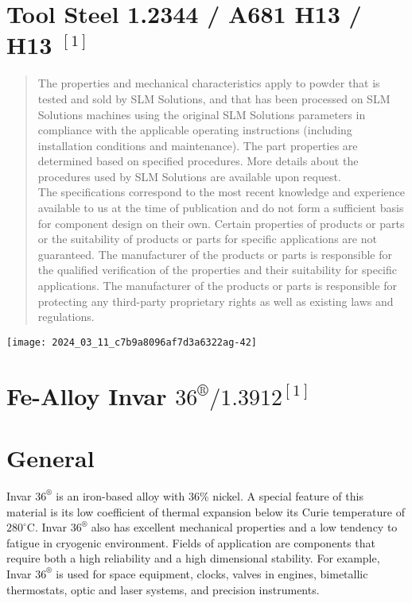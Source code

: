 \documentclass[10pt]{article}
\begin{document}
\section*{Tool Steel 1.2344 / A681 H13 / H13 ${ }^{[1]}$ }
\begin{abstract}
The properties and mechanical characteristics apply to powder that is tested and sold by SLM Solutions, and that has been processed on SLM Solutions machines using the original SLM Solutions parameters in compliance with the applicable operating instructions (including installation conditions and maintenance). The part properties are determined based on specified procedures. More details about the procedures used by SLM Solutions are available upon request.\\
The specifications correspond to the most recent knowledge and experience available to us at the time of publication and do not form a sufficient basis for component design on their own. Certain properties of products or parts or the suitability of products or parts for specific applications are not guaranteed. The manufacturer of the products or parts is responsible for the qualified verification of the properties and their suitability for specific applications. The manufacturer of the products or parts is responsible for protecting any third-party proprietary rights as well as existing laws and regulations.
\end{abstract}

\begin{center}
\texttt{[image: 2024\_03\_11\_c7b9a8096af7d3a6322ag-42]}
\end{center}

\section*{Fe-Alloy Invar $36^{\circledR} / 1.3912^{[1]}$}
\section*{General}
Invar $36^{\circledR}$ is an iron-based alloy with $36 \%$ nickel. A special feature of this material is its low coefficient of thermal expansion below its Curie temperature of $280^{\circ} \mathrm{C}$. Invar $36^{\circledR}$ also has excellent mechanical properties and a low tendency to fatigue in cryogenic environment. Fields of application are components that require both a high reliability and a high dimensional stability. For example, Invar $36^{\circledR}$ is used for space equipment, clocks, valves in engines, bimetallic thermostats, optic and laser systems, and precision instruments.
\end{document}

